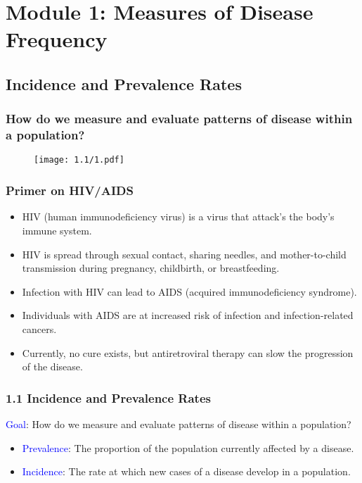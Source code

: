 \section{Module 1: Measures of Disease Frequency}
\subsection{Incidence and Prevalence Rates}
\subsubsection*{How do we measure and evaluate patterns of disease within a population?}
\begin{figure}[H]
    \centering
    \texttt{[image: 1.1/1.pdf]}
\end{figure}
\subsubsection*{Primer on HIV/AIDS}
\begin{itemize}
    \item HIV (human immunodeficiency virus) is a virus that attack’s the body’s immune
          system.
    \item HIV is spread through sexual contact, sharing needles, and mother-to-child
          transmission during pregnancy, childbirth, or breastfeeding.
    \item Infection with HIV can lead to AIDS (acquired immunodeficiency syndrome).
    \item Individuals with AIDS are at increased risk of infection and infection-related
          cancers.
    \item Currently, no cure exists, but antiretroviral therapy can slow the progression of the
          disease.
\end{itemize}
\subsubsection*{1.1 Incidence and Prevalence Rates}
\begin{Regular}
    \textcolor{Blue}{Goal}: How do we measure and evaluate patterns of disease within a population?
\end{Regular}
\begin{itemize}
    \item \textcolor{Blue}{Prevalence}: The proportion of the population currently affected by a disease.
    \item \textcolor{Blue}{Incidence}: The rate at which new cases of a disease develop in a population.
\end{itemize}
